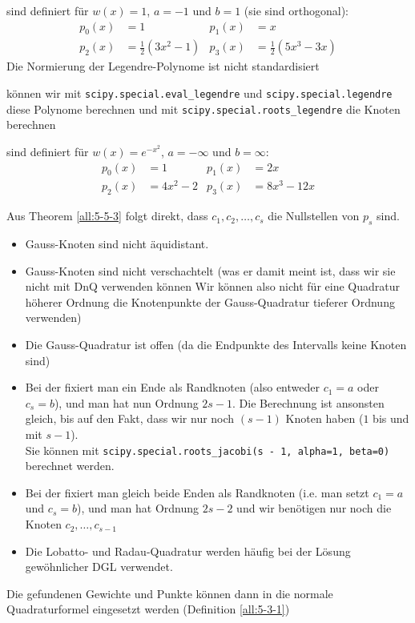  sind definiert für $w(x) = 1$, $a = -1$ und $b = 1$ (sie sind orthogonal):
\begin{align*}
    p_0(x) & = 1                     & p_1(x) & = x                      \\
    p_2(x) & = \frac{1}{2}(3x^2 - 1) & p_3(x) & = \frac{1}{2}(5x^3 - 3x)
\end{align*}
Die Normierung der Legendre-Polynome ist nicht standardisiert

\innumpy können wir mit
\texttt{scipy.special.eval\_legendre} und \texttt{scipy.special.legendre} diese Polynome berechnen und mit
\texttt{scipy.special.roots\_legendre} die Knoten berechnen

 sind definiert für $w(x) = e^{-x^2}$, $a = -\infty$ und $b = \infty$:
\begin{align*}
    p_0(x) & = 1        & p_1(x) & = 2x         \\
    p_2(x) & = 4x^2 - 2 & p_3(x) & = 8x^3 - 12x
\end{align*}

\inlineremark Aus Theorem \ref{all:5-5-3} folgt direkt, dass $c_1, c_2, \ldots, c_s$ die Nullstellen von $p_s$ sind.

\begin{itemize}
    \item Gauss-Knoten sind nicht äquidistant.
    \item Gauss-Knoten sind nicht verschachtelt (was er damit meint ist, dass wir sie nicht mit DnQ verwenden können \textemdash
          Wir können also nicht für eine Quadratur höherer Ordnung die Knotenpunkte der Gauss-Quadratur tieferer Ordnung verwenden)
    \item Die Gauss-Quadratur ist offen (da die Endpunkte des Intervalls keine Knoten sind)
    \item Bei der  fixiert man ein Ende als Randknoten (also entweder $c_1 = a$ oder $c_s = b$), und man hat nun Ordnung $2s - 1$.
          Die Berechnung ist ansonsten gleich, bis auf den Fakt, dass wir nur noch $(s - 1)$ Knoten haben ($1$ bis und mit $s - 1$).\\
          Sie können mit \texttt{scipy.special.roots\_jacobi(s - 1, alpha=1, beta=0)} berechnet werden.
    \item Bei der  fixiert man gleich beide Enden als Randknoten (i.e. man setzt $c_1 = a$ und $c_s = b$),
          und man hat Ordnung $2s - 2$ und wir benötigen nur noch die Knoten $c_2, \ldots, c_{s - 1}$
    \item Die Lobatto- und Radau-Quadratur werden häufig bei der Lösung gewöhnlicher DGL verwendet.
\end{itemize}
Die gefundenen Gewichte und Punkte können dann in die normale Quadraturformel eingesetzt werden (Definition \ref{all:5-3-1})

